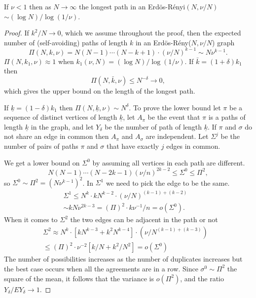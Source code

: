 \documentclass[10pt,a4paper]{amsart}
\def\ERns{Erd\"os-R\'enyi}
\begin{document}
\begin{lemma} \label{maxpER}
If $\nu<1$ then as $N \to\infty$ the longest path in an \ERns$(N,\nu/N)$
$\sim (\log N)/\log(1/\nu)$.
\end{lemma}

\begin{proof}
If $k^2/N \to 0$, which we assume throughout the proof, then the expected number of (self-avoiding) paths of length $k$ in an Erd\"os-R\'eny($N,\nu/N$) graph
$$
\Pi(N,k,\nu) = N(N-1) \cdots (N-k+1) \cdot (\nu/N)^{k-1} \sim N \nu^{k-1} .
$$
$\Pi(N,k_1,\nu) \approx 1$ when $k_1(\nu,N)= (\log N)/\log (1/\nu)$. If $\bar k = (1+\delta)k_1$ then 
$$
\Pi(N,\bar k,\nu) \le N^{-\delta} \to 0 ,
$$
which gives the upper bound on the length of the longest path. 

If $\underline{k} = (1-\delta) k_1$ then $\Pi(N,\underline{k},\nu) \sim N^\delta$. To prove the lower bound let $\pi$ be a sequence of distinct vertices of length $\underline{k}$, let $A_\pi$ be the event that $\pi$ is a paths of length $\underline{k}$ in the graph, and let $Y_\delta$ be the number of path of length $\underline{k}$. If $\pi$ and $\sigma$ do not share an edge in common then $A_{\pi}$ and $A_\sigma$ are independent. Let $\Sigma^j$ be the number of pairs of paths $\pi$ and $\sigma$ that have exactly $j$ edges in common. 

We get a lower bound on $\Sigma^0$ by assuming all vertices in each path are different.
$$
N(N-1) \cdots (N-2k-1)  (\nu/n)^{2k-2} \le \Sigma^0  \le \Pi^2 ,
$$
so $\Sigma^0 \sim \Pi^2= (N \nu^{k-1})^2$. In $\Sigma^1$ we need to pick the edge to be the same.
\begin{align*}
\Sigma^1  \le N^k \cdot k N^{k-2} \cdot ( \nu/N)^{(k-1)+(k-2)}& \\
\sim kN\nu^{2k-3}= (\Pi)^2 \cdot k \nu^{-1}/n = o(\Sigma^0). &
\end{align*}
 When it comes to $\Sigma^2$ the two edges can be adjacent in the path or not
\begin{align*}
\Sigma^2 \approx N^k \cdot [k N^{k-3} + k^2 N^{k-4}] 
\cdot ( \nu/N^{(k-1)+(k-3)})& \\
\le (\Pi)^2 \cdot \nu^{-2}  [k/N+ k^2/N^2] = o(\Sigma^0)&
\end{align*}
The number of possibilities increases as the number of duplicates increases but the best case occurs when all the agreements are in a row. Since $\sigma^0 \sim \Pi^2$ the square of the mean, it follows that the variance is $o(\Pi^2)$, and the ratio $Y_\delta/EY_\delta \to 1$.
\end{proof}
\end{document}
